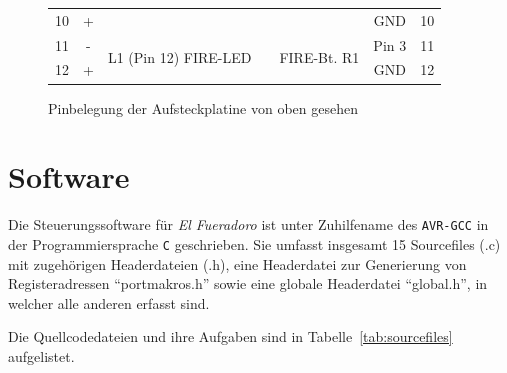 \documentclass[paper=a4, parskip, numbers=noenddot, toc=listof, headsepline]{scrbook}
\newcommand{\anlage}{\emph{El Fueradoro}}
\begin{document}
\begin{figure}
\begin{tabularx}{\textwidth}{|r|clXrc|l|}
						10 & +   &                                         &  &                                         & GND    & 10 \\
						11 & -   & \multirow{2}{*}{L1 (Pin 12) FIRE-LED}   &  & \multirow{2}{*}{FIRE-Bt. R1}            & Pin 3  & 11 \\
						12 & +   &                                         &  &                                         & GND    & 12 \\ \cline{1-1}\cline{7-7}
					\end{tabularx}
					\caption{Pinbelegung der Aufsteckplatine von oben gesehen}
					\label{fig:piclamps}
				\end{figure}

		\chapter{Software}

			Die Steuerungssoftware für {\anlage} ist unter Zuhilfename des \texttt{AVR-GCC} in der Programmiersprache \texttt{C} geschrieben. Sie umfasst insgesamt 15 Sourcefiles (.c) mit zugehörigen Headerdateien (.h), eine Headerdatei zur Generierung von Registeradressen \enquote{portmakros.h} sowie eine globale Headerdatei \enquote{global.h}, in welcher alle anderen erfasst sind.

			Die Quellcodedateien und ihre Aufgaben sind in Tabelle~\ref{tab:sourcefiles} aufgelistet.
\end{document}
